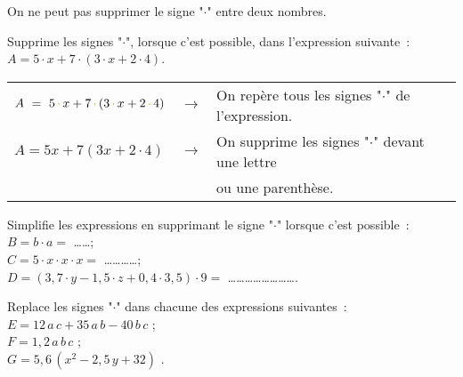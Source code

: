 \begin{methode*1}

\begin{remarque}
On ne peut pas supprimer le signe "$\cdot$" entre deux nombres.
\end{remarque}
 
\begin{exemple*1}
Supprime les signes "$\cdot$", lorsque c'est possible, dans l'expression suivante : $A = 5 \cdot x + 7 \cdot (3 \cdot x + 2 \cdot 4)$.
\begin{center}
 \begin{tabular}{lcl}
$A = 5\,\textcolor{H1}{\cdot}\,x + 7\,\textcolor{H1}{\cdot}\,(3\,\textcolor{H1}{\cdot}\,x + 2\,\textcolor{H1}{\cdot}\,4)$ & $\longrightarrow$ & On repère tous les signes "\textcolor{H1}{$\cdot$}" de l'expression. \\ %
$A = 5x + 7(3x + 2 \cdot 4)$ & $\longrightarrow$ & On supprime les signes "\textcolor{H1}{$\cdot$}" devant une lettre \\ %
& &  ou une parenthèse.
  \end{tabular}
 \end{center}
\end{exemple*1}

\exercice  
Simplifie les expressions en supprimant le signe "$\cdot$" lorsque c'est possible :\\[1em]
$B = b \cdot a =$ \ldots \ldots;\\[1em]
$C = 5 \cdot x \cdot x \cdot x =$ \ldots \ldots \ldots \ldots;\\[1em]
$D = (3,7 \cdot y - 1,5 \cdot z + 0,4 \cdot 3,5) \cdot 9 =$ \ldots \ldots \ldots \ldots \ldots \ldots \ldots \ldots.

\exercice  
Replace les signes "$\cdot$" dans chacune des expressions suivantes :\\[1em]
$E = 12\,a\,c + 35\,a\,b - 40\,b\,c$ \dotfill;\\[1em]
$F = 1,2\,a\,b\,c$ \dotfill;\\[1em]
$G = 5,6\,(x^2 - 2,5\,y + 32)$ \dotfill.

\end{methode*1}
 
\newpage
 
